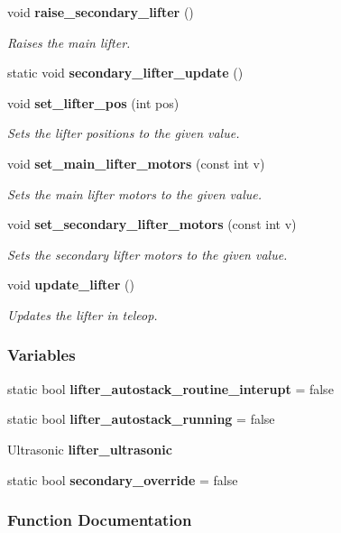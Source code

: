 \begin{DoxyCompactItemize}
void \textbf{ raise\+\_\+secondary\+\_\+lifter} ()
\begin{DoxyCompactList}\small\item\em Raises the main lifter. \end{DoxyCompactList}\item 
static void \textbf{ secondary\+\_\+lifter\+\_\+update} ()
\item 
void \textbf{ set\+\_\+lifter\+\_\+pos} (int pos)
\begin{DoxyCompactList}\small\item\em Sets the lifter positions to the given value. \end{DoxyCompactList}\item 
void \textbf{ set\+\_\+main\+\_\+lifter\+\_\+motors} (const int v)
\begin{DoxyCompactList}\small\item\em Sets the main lifter motors to the given value. \end{DoxyCompactList}\item 
void \textbf{ set\+\_\+secondary\+\_\+lifter\+\_\+motors} (const int v)
\begin{DoxyCompactList}\small\item\em Sets the secondary lifter motors to the given value. \end{DoxyCompactList}\item 
void \textbf{ update\+\_\+lifter} ()
\begin{DoxyCompactList}\small\item\em Updates the lifter in teleop. \end{DoxyCompactList}\end{DoxyCompactItemize}
\subsubsection*{Variables}
\begin{DoxyCompactItemize}
\item 
static bool \textbf{ lifter\+\_\+autostack\+\_\+routine\+\_\+interupt} = false
\item 
static bool \textbf{ lifter\+\_\+autostack\+\_\+running} = false
\item 
Ultrasonic \textbf{ lifter\+\_\+ultrasonic}
\item 
static bool \textbf{ secondary\+\_\+override} = false
\end{DoxyCompactItemize}


\subsubsection{Function Documentation}
\mbox{\label{lifter_8c_a453a3fb02960a7b90435e942bbe90d7a}} 
